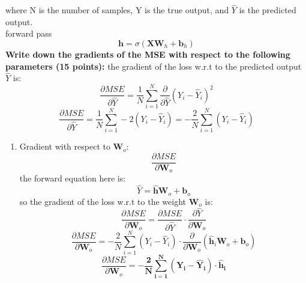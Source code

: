 \documentclass{article}
\begin{document}
where N is the number of samples, Y is the true output, and \(\hat{Y}\) is the predicted output.
\\ forward pass
\[
\mathbf{h} = \sigma(\mathbf{X} \mathbf{W}_h + \mathbf{b}_h)
\]
\textbf{Write down the gradients of the MSE with respect to the following parameters (15 points):}
the gradient of the loss w.r.t to the predicted output $\hat{Y}$ is:
\[
\frac{\partial MSE}{\partial \hat{Y}} = \frac{1}{N} \sum_{i=1}^{N} \frac{\partial}{\partial \hat{Y}} (Y_i - \hat{Y}_i)^2
\]
\[
\frac{\partial MSE}{\partial \hat{Y}} = \frac{1}{N} \sum_{i=1}^{N} -2(Y_i - \hat{Y}_i) = -\frac{2}{N} \sum_{i=1}^{N} (Y_i - \hat{Y}_i)
\]
\begin{enumerate}
    \item Gradient with respect to $\mathbf{W}_o$: $$\frac{\partial MSE}{\partial \mathbf{W}_o}$$
    the forward equation here is:
    \[
    \hat{Y} = \mathbf{\hat{h}} \mathbf{W}_o + \mathbf{b}_o
    \]
    so the gradient of the loss w.r.t to the weight $\mathbf{W}_o$ is:
    \[
    \frac{\partial MSE}{\partial \mathbf{W}_o} = \frac{\partial MSE}{\partial \hat{Y}} \cdot \frac{\partial \hat{Y}}{\partial \mathbf{W}_o}
    \]
    \[
    \frac{\partial MSE}{\partial \mathbf{W}_o} = -\frac{2}{N} \sum_{i=1}^{N} (Y_i - \hat{Y}_i) \cdot \frac{\partial}{\partial \mathbf{W}_o} (\mathbf{\hat{h}}_i \mathbf{W}_o + \mathbf{b}_o)
    \]
    \[
    \frac{\partial MSE}{\partial \mathbf{W}_o} = \mathbf{-\frac{2}{N} \sum_{i=1}^{N} (Y_i - \hat{Y}_i) \cdot \mathbf{\hat{h}}_i}
    \]
    

\end{enumerate}
\end{document}
